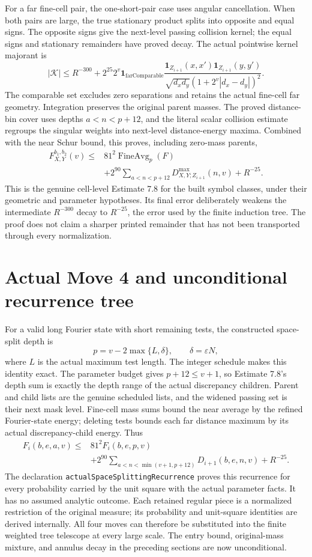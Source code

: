 \documentclass[11pt]{article}
\begin{document}
For a far fine-cell pair, the one-short-pair case uses angular cancellation.
When both pairs are large, the true stationary product splits into opposite
and equal signs. The opposite signs give the next-level passing collision
kernel; the equal signs and stationary remainders have proved decay. The
actual pointwise kernel majorant is
\[
|\mathcal K|\le R^{-300}+2^{25}2^v
\mathbf1_{\mathrm{farComparable}}
\frac{\mathbf1_{Z_{i+1}}(x,x')\mathbf1_{Z_{i+1}}(y,y')}
 {\sqrt{d_xd_y}(1+2^v|d_x-d_y|)^2}.
\]
The comparable set excludes zero separations and retains the actual fine-cell
far geometry. Integration preserves the original parent masses. The proved
distance-bin cover uses depths $a<n<p+12$, and the literal scalar collision
estimate regroups the singular weights into next-level distance-energy
maxima. Combined with the near Schur bound, this proves, including zero-mass
parents,
\[
\begin{aligned}
F_{X,Y}^{b_1,b_2}(v)\le{}&
81^2\operatorname{FineAvg}_{p}(F)\\
&+2^{90}\sum_{a<n<p+12}D_{X,Y;Z_{i+1}}^{\max}(n,v)+R^{-25}.
\end{aligned}
\]
This is the genuine cell-level Estimate 7.8 for the built symbol classes,
under their geometric and parameter hypotheses. Its final error deliberately
weakens the intermediate $R^{-300}$ decay to $R^{-25}$, the error used by the
finite induction tree. The proof does not claim a sharper printed remainder
that has not been transported through every normalization.

\newpage
\section*{Actual Move 4 and unconditional recurrence tree}
For a valid long Fourier state with short remaining tests, the constructed
space-split depth is
\[
p=v-2\max\{L,\delta\},\qquad \delta=\varepsilon N,
\]
where $L$ is the actual maximum test length. The integer schedule makes this
identity exact. The parameter budget gives $p+12\le v+1$, so Estimate 7.8's
depth sum is exactly the depth range of the actual discrepancy children.
Parent and child lists are the genuine scheduled lists, and the widened
passing set is their next mask level. Fine-cell mass sums bound the near
average by the refined Fourier-state energy; deleting tests bounds each far
distance maximum by its actual discrepancy-child energy. Thus
\[
\begin{aligned}
F_i(b,e,a,v)\le{}&81^2F_i(b,e,p,v)\\
&+2^{90}\sum_{a<n<\min(v+1,p+12)}D_{i+1}(b,e,n,v)+R^{-25}.
\end{aligned}
\]
The declaration \texttt{actualSpaceSplittingRecurrence} proves this recurrence
for every probability carried by the unit square with the actual parameter
facts. It has no assumed analytic outcome. Each retained regular piece is a
normalized restriction of the original measure; its probability and
unit-square identities are derived internally. All four moves can therefore
be substituted into the finite weighted tree telescope at every large scale.
The entry bound, original-mass mixture, and annulus decay in the preceding
sections are now unconditional.
\end{document}
